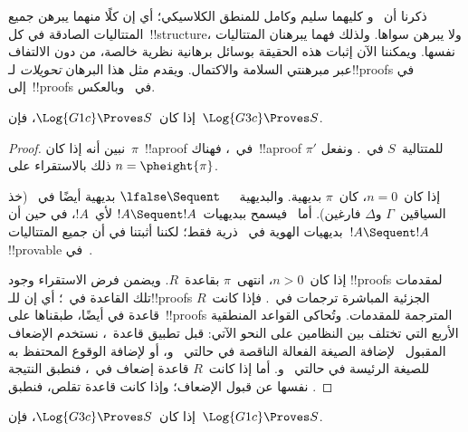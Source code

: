 \documentclass[../../../include/open-logic-section]{subfiles}
\begin{document}


ذكرنا أن~ و كليهما سليم وكامل للمنطق الكلاسيكي؛ أي
إن كلًا منهما يبرهن جميع المتتاليات الصادقة في كل~!!{structure}، ولا
يبرهن سواها. ولذلك فهما يبرهنان المتتاليات نفسها. ويمكننا الآن إثبات هذه
الحقيقة بوسائل برهانية نظرية خالصة، من دون الالتفاف عبر مبرهنتي السلامة
والاكتمال. ويقدم مثل هذا البرهان \emph{تحويلات} لـ!!{proof}s في
 إلى~!!{proof}s في~ وبالعكس.

\begin{prop}
إذا كان~$\Log{G1c}\Proves S$، فإن~$\Log{G3c}\Proves S$.
\end{prop}

\begin{proof}
  نبين أنه إذا كان~$\pi$~!!a{proof} في~، فهناك~!!a{proof}
  $\pi'$ للمتتالية~$S$ في~. ونفعل ذلك بالاستقراء على
  $n=\pheight{\pi}$.

  إذا كان~$n=0$، كان~$\pi$ بديهية. والبديهية~$\lfalse\Sequent\quad$
  بديهية أيضًا في~ (خذ السياقين~$\Gamma$ و$\Delta$ فارغين).
  أما~ فيسمح ببديهيات~$!A\Sequent !A$ لأي~$!A$، في حين أن
  بديهيات الهوية في~ ذرية فقط؛ لكننا أثبتنا في
   أن جميع المتتاليات~$!A\Sequent !A$
  !!{provable} في~.

  إذا كان~$n>0$، انتهى~$\pi$ بقاعدة~$R$. ويضمن فرض الاستقراء وجود
  !!{proof}s لمقدمات تلك القاعدة في~؛ أي إن للـ!!{proof}s
  الجزئية المباشرة ترجمات في~. فإذا كانت~$R$ قاعدة في
   أيضًا، طبقناها على~!!{proof}s المترجمة للمقدمات.
  وتُحاكى القواعد المنطقية الأربع
  التي تختلف بين النظامين على النحو الآتي: قبل تطبيق قاعدة~،
  نستخدم الإضعاف المقبول~ لإضافة الصيغة
  الفعالة الناقصة في حالتي~\LeftR{\land} و\RightR{\lor}، أو لإضافة
  الوقوع المحتفظ به للصيغة الرئيسة في حالتي~\LeftR{\lforall}
  و\RightR{\lexists}. أما إذا كانت~$R$ قاعدة إضعاف في~، فنطبق
  النتيجة نفسها عن قبول الإضعاف؛ وإذا كانت قاعدة تقلص، فنطبق
  .
\end{proof}

\begin{prop}
إذا كان~$\Log{G3c}\Proves S$، فإن~$\Log{G1c}\Proves S$.
\end{prop}
\end{document}
